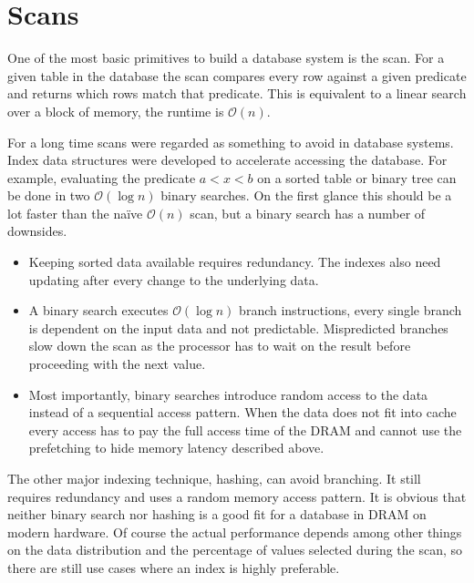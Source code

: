 \newpage
\section{Scans}

One of the most basic primitives to build a database system is the scan. For a
given table in the database the scan compares every row against a given
predicate and returns which rows match that predicate. This is equivalent to a
linear search over a block of memory, the runtime is $\mathcal{O}(n)$.

For a long time scans were regarded as something to avoid in database systems.
Index data structures were developed to accelerate accessing the database. For
example, evaluating the predicate $a < x < b$ on a sorted table or binary tree
can be done in two $\mathcal{O}(\log n)$ binary searches. On the first glance
this should be a lot faster than the na\"ive $\mathcal{O}(n)$ scan, but a binary
search has a number of downsides.

\begin{itemize}
  \item Keeping sorted data available requires redundancy. The indexes also need
    updating after every change to the underlying data.
  \item A binary search executes $\mathcal{O}(\log n)$ branch instructions,
    every single branch is dependent on the input data and not predictable.
    Mispredicted branches slow down the scan as the processor has to wait on the
    result before proceeding with the next value.
  \item Most importantly, binary searches introduce random access to the data
    instead of a sequential access pattern. When the data does not fit into
    cache every access has to pay the full access time of the DRAM and cannot
    use the prefetching to hide memory latency described above.
\end{itemize}

The other major indexing technique, hashing, can avoid branching. It still
requires redundancy and uses a random memory access pattern. It is obvious that
neither binary search nor hashing is a good fit for a database in DRAM on modern
hardware. Of course the actual performance depends among other things on the data
distribution and the percentage of values selected during the scan, so there are
still use cases where an index is highly preferable.


